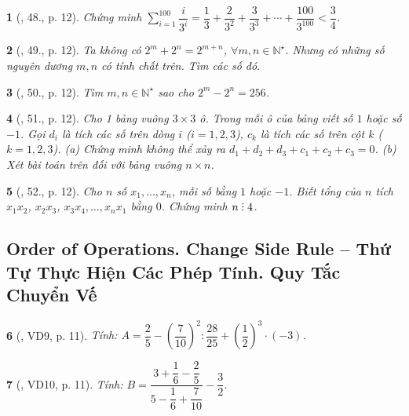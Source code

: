 \documentclass{article}
\newtheorem{baitoan}{}
\DeclareRobustCommand{\divby}{%
	\mathrel{\vbox{\baselineskip.65ex\lineskiplimit0pt\hbox{.}\hbox{.}\hbox{.}}}%
}
\begin{document}
\begin{baitoan}[\cite{Binh_Toan_7_tap_1}, 48., p. 12]
	Chứng minh $\sum_{i=1}^{100} \dfrac{i}{3^i} = \dfrac{1}{3} + \dfrac{2}{3^2} + \dfrac{3}{3^3} + \cdots + \dfrac{100}{3^{100}} < \dfrac{3}{4}$.
\end{baitoan}

\begin{baitoan}[\cite{Binh_Toan_7_tap_1}, 49., p. 12]
	Ta không có $2^m + 2^n = 2^{m+n}$, $\forall m,n\in\mathbb{N}^\star$. Nhưng có những số nguyên dương $m,n$ có tính chất trên. Tìm các số đó.
\end{baitoan}

\begin{baitoan}[\cite{Binh_Toan_7_tap_1}, 50., p. 12]
	Tìm $m,n\in\mathbb{N}^\star$ sao cho $2^m - 2^n = 256$.
\end{baitoan}

\begin{baitoan}[\cite{Binh_Toan_7_tap_1}, 51., p. 12]
	Cho 1 bảng vuông $3\times 3$ ô. Trong mỗi ô của bảng viết số $1$ hoặc số $-1$. Gọi $d_i$ là tích các số trên dòng $i$ ($i = 1,2,3$), $c_k$ là tích các số trên cột $k$ ($k = 1,2,3$). (a) Chứng minh không thể xảy ra $d_1 + d_2 + d_3 + c_1 + c_2 + c_3 = 0$. (b) Xét bài toán trên đối với bảng vuông $n\times n$.	
\end{baitoan}

\begin{baitoan}[\cite{Binh_Toan_7_tap_1}, 52., p. 12]
	Cho $n$ số $x_1,\ldots,x_n$, mỗi số bằng $1$ hoặc $-1$. Biết tổng của $n$ tích $x_1x_2$, $x_2x_3$, $x_3x_4,\ldots,x_nx_1$ bằng $0$. Chứng minh $n\divby4$.
\end{baitoan}


\subsection{Order of Operations. Change Side Rule -- Thứ Tự Thực Hiện Các Phép Tính. Quy Tắc Chuyển Vế}

\begin{baitoan}[\cite{Tuyen_Toan_7}, VD9, p. 11]
	Tính: $A = \dfrac{2}{5} - \left(\dfrac{7}{10}\right)^2:\dfrac{28}{25} + \left(\dfrac{1}{2}\right)^3\cdot(-3)$.
\end{baitoan}

\begin{baitoan}[\cite{Tuyen_Toan_7}, VD10, p. 11]
	Tính: $B = \dfrac{3 + \dfrac{1}{6} - \dfrac{2}{5}}{5 - \dfrac{1}{6} + \dfrac{7}{10}} - \dfrac{3}{2}$.
\end{baitoan}
\end{document}
